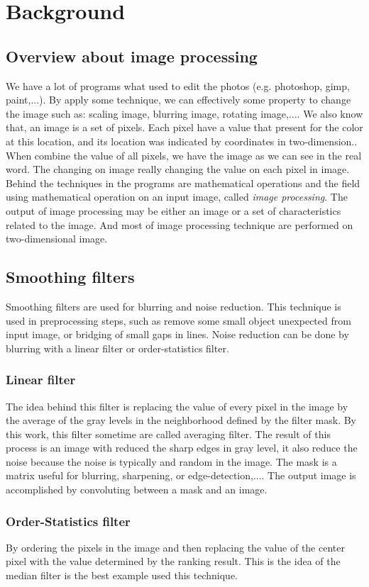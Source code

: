 \chapter{Background}\section{Overview about image processing}
We have a lot of programs what used to edit the photos (e.g. photoshop, gimp, paint,...). By apply some technique, we can effectively some property to change the image such as: scaling image, blurring image, rotating image,.... We also know that, an image is a set of pixels. Each pixel have a value that present for the color at this location, and its location was indicated by coordinates in two-dimension.. When combine the value of all pixels, we have the image as we can see in the real word. The changing on image really changing the value on each pixel in image. Behind the techniques in the programs are mathematical operations and the field using mathematical operation on an input image,  called \textit{image processing}. The output of image processing may be either an image or a set of characteristics related to the image. And most of image processing technique are performed on two-dimensional image.
\section{Smoothing filters}
Smoothing filters are used for blurring and noise reduction. This technique is used in preprocessing steps, such as remove some small object unexpected from input image, or bridging of small gaps in lines. Noise reduction can be done by blurring with a linear filter or order-statistics filter.
\subsection{Linear filter}The idea behind this filter is replacing the value of every pixel in the image by the average of the gray levels in the neighborhood defined by the filter mask. By this work, this filter sometime are called averaging filter. The result of this process is an image with reduced the sharp edges in gray level, it also reduce the noise because the noise is typically and random in the image. The mask is a matrix useful for blurring, sharpening, or edge-detection,.... The output image is accomplished by convoluting between a mask and an image.
\subsection{Order-Statistics filter}By ordering the pixels in the image and then replacing the value of the center pixel with the value determined by the ranking result. This is the idea of the median filter is the best example used this technique.
